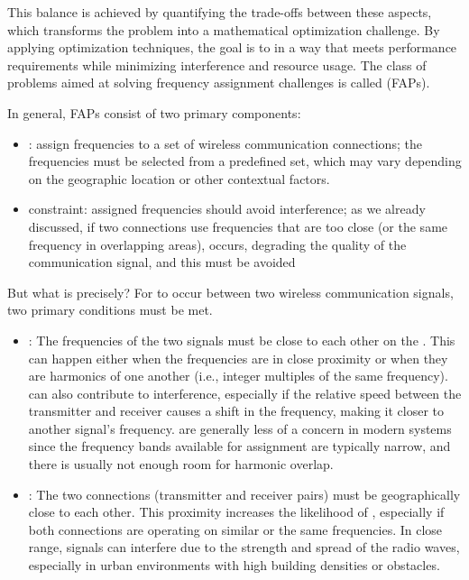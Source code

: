 \documentclass[a4paper, 12pt]{report}
\begin{document}
    This balance is achieved by quantifying the trade-offs between these aspects, which transforms the problem into a mathematical optimization challenge. By applying optimization techniques, the goal is to  in a way that meets performance requirements while minimizing interference and resource usage. The class of problems aimed at solving frequency assignment challenges is called  (FAPs).

    In general, FAPs consist of two primary components:

    \begin{itemize}
        \item {}: assign frequencies to a set of wireless communication connections; the frequencies must be selected from a predefined set, which may vary depending on the geographic location or other contextual factors.
        \item {constraint}: assigned frequencies should avoid interference; as we already discussed, if two connections use frequencies that are too close (or the same frequency in overlapping areas),  occurs, degrading the quality of the communication signal, and this must be avoided
    \end{itemize}

    But what is  precisely? For  to occur between two wireless communication signals, two primary conditions must be met.

    \begin{itemize}
        \item {}: The frequencies of the two signals must be close to each other on the . This can happen either when the frequencies are in close proximity or when they are harmonics of one another (i.e., integer multiples of the same frequency).  can also contribute to interference, especially if the relative speed between the transmitter and receiver causes a shift in the frequency, making it closer to another signal's frequency.  are generally less of a concern in modern systems since the frequency bands available for assignment are typically narrow, and there is usually not enough room for harmonic overlap.
        \item {}: The two connections (transmitter and receiver pairs) must be geographically close to each other. This proximity increases the likelihood of , especially if both connections are operating on similar or the same frequencies. In close range, signals can interfere due to the strength and spread of the radio waves, especially in urban environments with high building densities or obstacles.
    \end{itemize}
\end{document}
